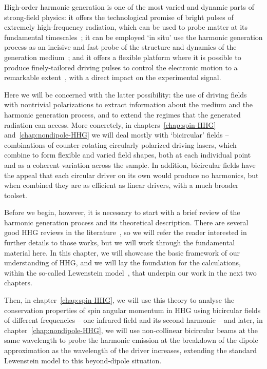 High-order harmonic generation is one of the most varied and dynamic parts of strong-field physics: it offers the technological promise of bright pulses of extremely high-fre\-quen\-cy radiation, which can be used to probe matter at its fundamental timescales~\cite{popmintchev_record_2012, calegari_phenylalanine_2014}; it can be employed `in situ' use the harmonic generation process as an incisive and fast probe of the structure and dynamics of the generation medium~\cite{mairesse_high-harmonic-spectroscopy_2010}; and it offers a flexible platform where it is possible to produce finely-tailored driving pulses to control the electronic motion to a remarkable extent~\cite{ chipperfield_ideal_2009, brugnera_hhg-orthogonal_2011}, with a direct impact on the experimental signal.


Here we will be concerned with the latter possibility: the use of driving fields with nontrivial polarizations to extract information about the medium and the harmonic generation process, and to extend the regimes that the generated radiation can access. More concretely, in chapters~\ref{chap:spin-HHG} and~\ref{chap:nondipole-HHG} we will deal mostly with `bicircular' fields -- combinations of counter-rotating circularly polarized driving lasers, which combine to form flexible and varied field shapes, both at each individual point and as a coherent variation across the sample. In addition, bicircular fields have the appeal that each circular driver on its own would produce no harmonics, but when combined they are as efficient as linear drivers, with a much broader toolset.

Before we begin, however, it is necessary to start with a brief review of the harmonic generation process and its theoretical description. There are several good HHG reviews in the literature~\cite{ JoachainHHGReview, krausz-ivanov_attosecond-review_2009, HHGTutorial, kohler_chapter_2012}, so we will refer the reader interested in further details to those works, but we will work through the fundamental material here. In this chapter, we will showcase the basic framework of our understanding of HHG, and we will lay the foundation for the calculations, within the so-called Lewenstein model~\cite{LewensteinHHG}, that underpin our work in the next two chapters. 

Then, in chapter~\ref{chap:spin-HHG}, we will use this theory to analyse the conservation properties of spin angular momentum in HHG using bicircular fields of different frequencies -- one infrared field and its second harmonic -- and later, in chapter~\ref{chap:nondipole-HHG}, we will use non-collinear bicircular beams at the same wavelength to probe the harmonic emission at the breakdown of the dipole approximation as the wavelength of the driver increases, extending the standard Lewenstein model to this beyond-dipole situation.



